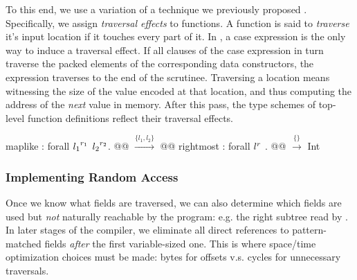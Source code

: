 To this end, we use a variation of a technique we previously proposed
\cite{ecoop17-gibbon}.  Specifically, we assign \emph{traversal effects} to
functions.  A function is said to {\em traverse} it's input location if it
touches every part of it.  In \ourcalc{}, a case expression is the only way to
induce a traversal effect.  If all clauses of the case expression in turn
traverse the packed elements of the corresponding data constructors, the
expression traverses to the end of the scrutinee.
%
Traversing a location means witnessing the size of the value encoded at that
location, and thus computing the address of the \emph{next} value in memory.
%
After this pass, the type schemes of top-level function definitions reflect
their traversal effects.


\begin{code}
maplike : forall ${l_1}^{r_1}$ ${l_2}^{r_2}$. @@ $\xrightarrow{\{ l_1, l_2 \}}$ @@
rightmost : forall ${l}^{r}$ . @@ $\xrightarrow{\{\}}$ Int
\end{code}

\subsubsection{Implementing Random Access}
\label{sec:rand-access}

Once we know what fields are traversed, we can also determine which fields are
used but \emph{not} naturally reachable by the program: e.g. the right subtree
read by .
%
In later stages of the compiler, we eliminate all direct references to
pattern-matched fields {\em after} the first variable-sized one.
%
This is where space/time optimization choices must be made:
bytes for offsets v.s. cycles for unnecessary traversals.

